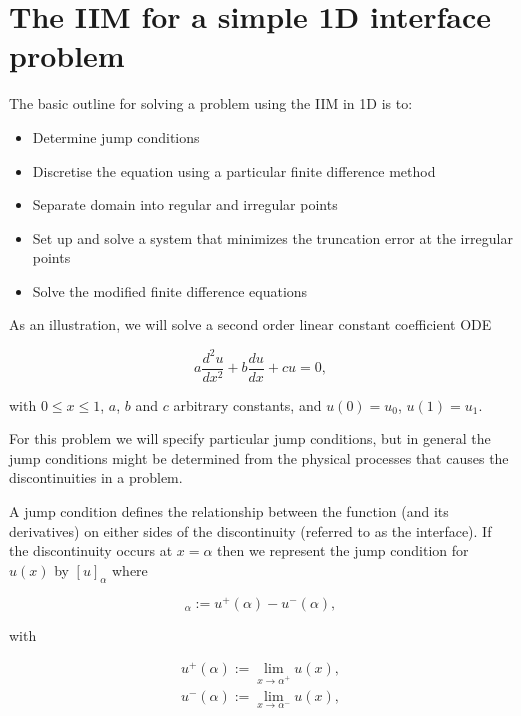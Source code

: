 \section{The IIM for a simple 1D interface problem}
\label{OneD}

The basic outline for solving a problem using the IIM in 1D is to:

\begin{itemize}
    \item Determine jump conditions
    \item Discretise the equation using a particular finite difference method
    \item Separate domain into regular and irregular points
    \item Set up and solve a system that minimizes the truncation error at the irregular points
    \item Solve the modified finite difference equations
\end{itemize}

As an illustration, we will solve a second order linear constant coefficient ODE

\begin{equation}
    a\frac{d^2u}{dx^2} + b\frac{du}{dx} + cu = 0, 
\end{equation}

with $0\leq x \leq 1$, $a$, $b$ and $c$ arbitrary constants, and $u(0) = u_0$, $u(1) = u_1$.

For this problem we will specify  particular jump conditions, but in general the jump conditions might be determined from the physical processes that causes the discontinuities in a problem.

A jump condition defines the relationship between the function (and its derivatives) on either sides of the discontinuity (referred to as the interface). If the discontinuity occurs at $x = \alpha$ then we represent the jump condition for $u(x)$ by $[u]_\alpha$ where

\begin{equation}
    [u]_\alpha := u^+(\alpha) - u^-(\alpha),
\end{equation}

with

\begin{align}
    u^+(\alpha) := \lim_{x \to \alpha^+} u(x), \nonumber \\
    u^-(\alpha) := \lim_{x \to \alpha^-} u(x) \nonumber,
\end{align}

